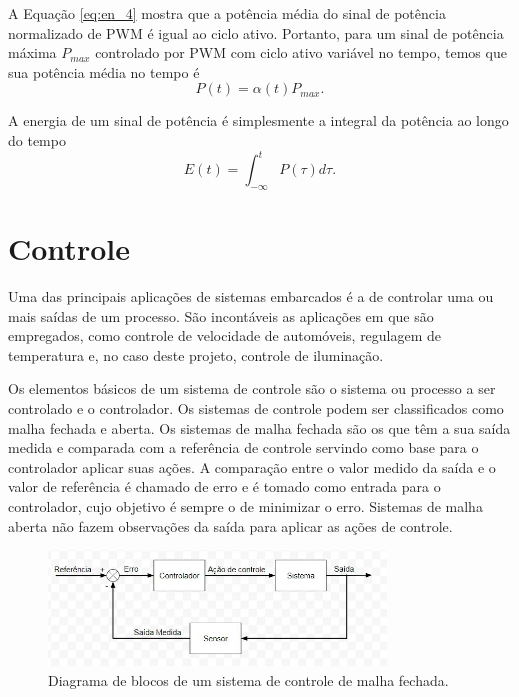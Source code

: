 A Equação \eqref{eq:en_4} mostra que a potência média do sinal de potência normalizado de PWM é igual ao ciclo ativo. Portanto, para um sinal de potência máxima $P_{max}$ controlado por PWM com ciclo ativo variável no tempo, temos que sua potência média no tempo é
\begin{equation}
    \label{eq:en_5}
    P(t) = \alpha(t)P_{max}.
\end{equation}

A energia de um sinal de potência é simplesmente a integral da potência ao longo do tempo
\begin{equation}
    \label{eq:en_6}
    E(t) = \int_{-\infty}^{t}P(\tau)d\tau.
\end{equation}

\section{Controle}

Uma das principais aplicações de sistemas embarcados é a de controlar uma ou mais saídas de um processo. São incontáveis as aplicações em que são empregados, como controle de velocidade de automóveis, regulagem de temperatura e, no caso deste projeto, controle de iluminação. 

Os elementos básicos de um sistema de controle são o sistema ou processo a ser controlado e o controlador. Os sistemas de controle podem ser classificados como malha fechada e aberta. Os sistemas de malha fechada são os que têm a sua saída medida e comparada com a referência de controle servindo como base para o controlador aplicar suas ações. A comparação entre o valor medido da saída e o valor de referência é chamado de erro e é tomado como entrada para o controlador, cujo objetivo é sempre o de minimizar o erro. Sistemas de malha aberta não fazem observações da saída para aplicar as ações de controle.

\begin{figure}[ht]
    \begin{center}
    \includegraphics[width=0.8\textwidth]{figuras/malha.JPG}
    \end{center}
    \caption[Diagrama de blocos um sistema de controle de malha fechada.]{Diagrama de blocos de um sistema de controle de malha fechada.}
    \label{malha}
\end{figure}

